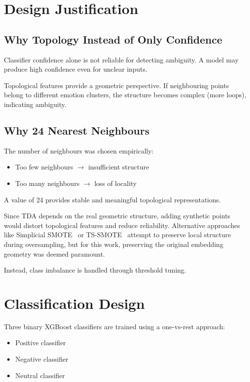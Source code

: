 \section{Design Justification}

\subsection{Why Topology Instead of Only Confidence}

Classifier confidence alone is not reliable for detecting ambiguity. A model may produce
high confidence even for unclear inputs.

Topological features provide a geometric perspective. If neighbouring points belong to different
emotion clusters, the structure becomes complex (more loops), indicating ambiguity.

\subsection{Why 24 Nearest Neighbours}

The number of neighbours was chosen empirically:
\begin{itemize}
    \item Too few neighbours $\rightarrow$ insufficient structure
    \item Too many neighbours $\rightarrow$ loss of locality
\end{itemize}
A value of 24 provides stable and meaningful topological representations.

Since TDA depends on the real geometric structure, adding synthetic points would distort
topological features and reduce reliability. Alternative approaches like Simplicial
SMOTE~\cite{simplicial_smote} or TS-SMOTE~\cite{ts_smote} attempt to preserve local structure
during oversampling, but for this work, preserving the original embedding geometry was deemed
paramount.

Instead, class imbalance is handled through threshold tuning.

\section{Classification Design}

Three binary XGBoost classifiers are trained using a one-vs-rest approach:
\begin{itemize}
    \item Positive classifier
    \item Negative classifier
    \item Neutral classifier
\end{itemize}

